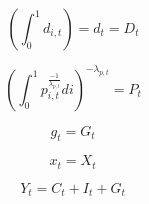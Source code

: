 \begin{equation}\label{TAppEqMarkClrD}
   \left(\int_{0}^{1}d_{i,t}\right) = d_t = D_t
\end{equation}

\begin{equation}\label{TAppEqMarkClrpit}
   \left(\int_{0}^{1}p_{i,t}^{\frac{-1}{\lambda_{p,t}}}di\right)^{-\lambda_{p,t}} = P_t
\end{equation}

\begin{equation}\label{TAppEqMarkClrG}
   g_t = G_t
\end{equation}

\begin{equation}\label{TAppEqMarkClrX}
   x_t = X_t
\end{equation}

\begin{equation}\label{TAppEqMarkClrResConst}
   Y_t = C_t + I_t + G_t
\end{equation}